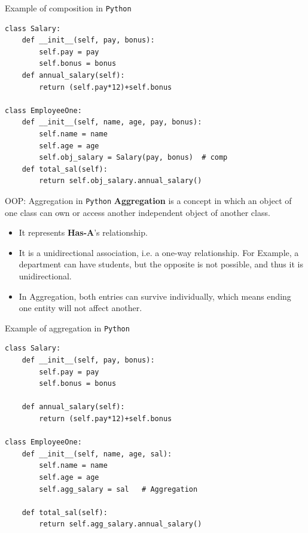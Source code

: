\documentclass[10pt]{beamer}
\begin{document}
\begin{frame}[fragile]{Example of composition in \texttt{Python}}
\begin{lstlisting}[style=mypython]
class Salary:
	def __init__(self, pay, bonus):
		self.pay = pay
		self.bonus = bonus
	def annual_salary(self):
		return (self.pay*12)+self.bonus

class EmployeeOne:
	def __init__(self, name, age, pay, bonus):
		self.name = name
		self.age = age
		self.obj_salary = Salary(pay, bonus)  # comp
	def total_sal(self):
		return self.obj_salary.annual_salary()
\end{lstlisting}
\end{frame}

\begin{frame}[fragile]{OOP: Aggregation in \texttt{Python}}
\textbf{Aggregation} is a concept in which an object of one class can own or access another independent object of another class. 

\begin{itemize}
\item It represents \textbf{Has-A}'s relationship.
\item It is a unidirectional association, i.e. a one-way relationship. For Example, a department can have students, but the opposite is not possible, and thus it is unidirectional.
\item In Aggregation, both entries can survive individually, which means ending one entity will not affect another.	
\end{itemize}

\end{frame}

\begin{frame}[fragile]{Example of aggregation in \texttt{Python}}
\begin{lstlisting}[style=mypython]
class Salary:
	def __init__(self, pay, bonus):
		self.pay = pay
		self.bonus = bonus
	
	def annual_salary(self):
		return (self.pay*12)+self.bonus
	
class EmployeeOne:
	def __init__(self, name, age, sal):
		self.name = name
		self.age = age
		self.agg_salary = sal   # Aggregation
	
	def total_sal(self):
		return self.agg_salary.annual_salary()
\end{lstlisting}
\end{frame}
\end{document}
